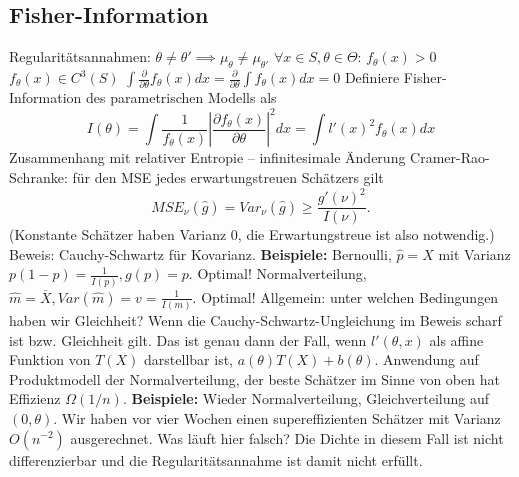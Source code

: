 \subsection{Fisher-Information}
\begin{outline}
    \1 Regularitätsannahmen:
        \2 $\theta \neq \theta' \implies \mu_\theta \neq \mu_{\theta'}$
        \2 $\forall x\in S,\theta\in \Theta$: $f_\theta(x) > 0$
        \2 $f_\theta(x)\in C^3(S)$
        \2 $\int \frac{\partial}{\partial\theta}f_\theta(x)dx =
        \frac{\partial}{\partial\theta} \int f_\theta(x)dx=0$
    \1 Definiere Fisher-Information des parametrischen Modells als 
        $$I(\theta)=\int \frac{1}{f_\theta(x)} |\frac{\partial f_\theta(x)}{\partial\theta}|^2 dx = \int l'(x)^2 f_\theta(x) dx$$
    \1 Zusammenhang mit relativer Entropie -- infinitesimale Änderung 
    \1 Cramer-Rao-Schranke: für den MSE jedes erwartungstreuen Schätzers gilt
    $$MSE_\nu(\hat{g})=Var_\nu(\hat{g})\geq \frac{g'(\nu)^2}{I(\nu)}.$$
        \2 (Konstante Schätzer haben Varianz 0, die Erwartungstreue ist also notwendig.)
        \2 Beweis: Cauchy-Schwartz für Kovarianz.
\0 \textbf{Beispiele:} Bernoulli, $\hat{p}=X$ mit Varianz $p(1-p)=\frac{1}{I(p)}, g(p)=p$. Optimal! Normalverteilung, $\hat{m}=\overline{X}, Var(\hat{m})=v=\frac{1}{I(m)}$. Optimal! Allgemein: unter welchen Bedingungen haben wir Gleichheit? Wenn die Cauchy-Schwartz-Ungleichung im Beweis scharf ist bzw. Gleichheit gilt. Das ist genau dann der Fall, wenn $l'(\theta, x)$ als affine Funktion von $T(X)$ darstellbar ist, $a(\theta) T(X)+b(\theta)$. 
    \1 Anwendung auf Produktmodell der Normalverteilung, der beste Schätzer im Sinne von oben hat Effizienz $\Omega(1/n)$.
\0 \textbf{Beispiele:} Wieder Normalverteilung, Gleichverteilung auf $(0,\theta)$. Wir haben vor vier Wochen einen supereffizienten Schätzer mit Varianz $O(n^{-2})$ ausgerechnet. Was läuft hier falsch? Die Dichte in diesem Fall ist nicht differenzierbar und die Regularitätsannahme ist damit nicht erfüllt. 
\end{outline}

